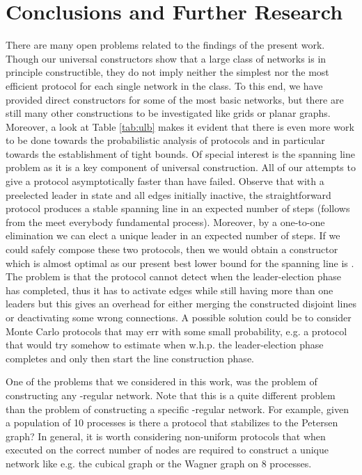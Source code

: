 \documentclass[oribibl, 11pt]{llncs}
\begin{document}
\section{Conclusions and Further Research}
\label{sec:conclusions}

There are many open problems related to the findings of the present work. Though our universal constructors show that a large class of networks is in principle constructible, they do not imply neither the simplest nor the most efficient protocol for each single network in the class. To this end, we have provided direct constructors for some of the most basic networks, but there are still many other constructions to be investigated like grids or planar graphs. Moreover, a look at Table \ref{tab:ulb} makes it evident that there is even more work to be done towards the probabilistic analysis of protocols and in particular towards the establishment of tight bounds. Of special interest is the spanning line problem as it is a key component of universal construction. All of our attempts to give a protocol asymptotically faster than  have failed. Observe that with a preelected leader in state  and all edges initially inactive, the straightforward protocol  produces a stable spanning line in an expected number of  steps (follows from the meet everybody fundamental process). Moreover, by a one-to-one elimination we can elect a unique leader in an expected number of  steps. If we could safely compose these two protocols, then we would obtain a  constructor which is almost optimal as our present best lower bound for the spanning line is . The problem is that the protocol cannot detect when the leader-election phase has completed, thus it has to activate edges while still having more than one leaders but this gives an overhead for either merging the constructed disjoint lines or deactivating some wrong connections. A possible solution could be to consider Monte Carlo protocols that may err with some small probability, e.g. a protocol that would try somehow to estimate when w.h.p. the leader-election phase completes and only then start the line construction phase. 

One of the problems that we considered in this work, was the problem of constructing any -regular network. Note that this is a quite different problem than the problem of constructing a specific -regular network. For example, given a population of 10 processes is there a protocol that stabilizes to the Petersen graph? In general, it is worth considering non-uniform protocols that when executed on the correct number of nodes are required to construct a unique network like e.g. the cubical graph or the Wagner graph on 8 processes. 
\end{document}
